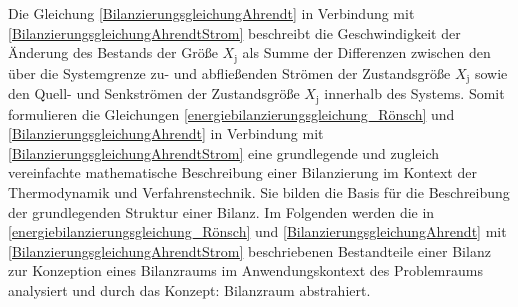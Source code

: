 Die Gleichung \eqref{BilanzierungsgleichungAhrendt} in Verbindung mit \eqref{BilanzierungsgleichungAhrendtStrom} beschreibt die Geschwindigkeit 
der Änderung des Bestands der Größe \(X_{\text{j}}\) als Summe der Differenzen zwischen den über die Systemgrenze zu- und abfließenden Strömen der 
Zustandsgröße \(X_{\text{j}}\) sowie den Quell- und Senkströmen der Zustandsgröße \(X_{\text{j}}\) innerhalb des Systems.  
Somit formulieren die Gleichungen \eqref{energiebilanzierungsgleichung_Rönsch} und \eqref{BilanzierungsgleichungAhrendt} in Verbindung mit 
\eqref{BilanzierungsgleichungAhrendtStrom} eine grundlegende und zugleich vereinfachte mathematische Beschreibung einer Bilanzierung im Kontext 
der Thermodynamik und Verfahrenstechnik. Sie bilden die Basis für die Beschreibung der grundlegenden Struktur einer Bilanz.
Im Folgenden werden die in \eqref{energiebilanzierungsgleichung_Rönsch} und \eqref{BilanzierungsgleichungAhrendt} mit \eqref{BilanzierungsgleichungAhrendtStrom} 
beschriebenen Bestandteile einer Bilanz zur Konzeption eines Bilanzraums im Anwendungskontext des Problemraums analysiert und durch das Konzept: Bilanzraum abstrahiert.